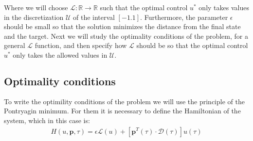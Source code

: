 Where we will choose $ \mathcal {L}: \mathbb {R} \rightarrow \mathbb {R} $ such that the optimal control $ u^* $ only takes values in the discretization $ \mathcal {U} $ of the interval $ [- 1.1] $. Furthermore, the parameter $ \epsilon $ should be small so that the solution minimizes the distance from the final state and the target.
%
Next we will study the optimality conditions of the problem, for a general $ \mathcal {L} $ function, and then specify how $ \mathcal {L} $ should be so that the optimal control $ u ^ * $ only takes the allowed values in $ \mathcal {U} $.

\subsection{Optimality conditions}

To write the optimility conditions of the problem we will use the principle of the Pontryagin minimum. For them it is necessary to define the Hamiltonian of the system, which in this case is:
\begin{gather}\label{hamil}
    H(u,\bm{p},\tau) = 
    \epsilon \mathcal{L}(u) + 
    [\bm{p}^T(\tau) \cdot \bm{\mathcal{D}}(\tau)]
    u(\tau)
\end{gather}

